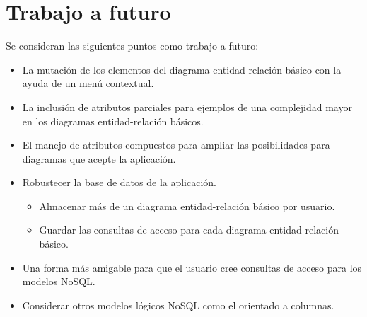 \section{Trabajo a futuro}

Se consideran las siguientes puntos como trabajo a futuro:

\begin{itemize}
  \item La mutación de los elementos del diagrama entidad-relación básico con la ayuda de un menú contextual.
  \item La inclusión de atributos parciales para ejemplos de una complejidad mayor en los diagramas entidad-relación básicos.
  \item El manejo de atributos compuestos para ampliar las posibilidades para diagramas que acepte la aplicación.
  \item Robustecer la base de datos de la aplicación.
  \begin{itemize}
    \item Almacenar más de un diagrama entidad-relación básico por usuario.
    \item Guardar las consultas de acceso para cada diagrama entidad-relación básico.
  \end{itemize}
  \item Una forma más amigable para que el usuario cree consultas de acceso para los modelos NoSQL.
  \item Considerar otros modelos lógicos NoSQL como el orientado a columnas.
\end{itemize}